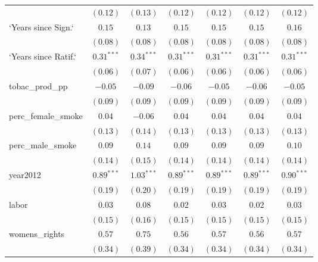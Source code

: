 \begin{table}[!h]
\begin{center}
\begin{tabular}{l c c c c c c }
                        & $(0.12)$     & $(0.13)$      & $(0.12)$     & $(0.12)$     & $(0.12)$     & $(0.12)$     \\
`Years since Sign.`     & $0.15$       & $0.13$        & $0.15$       & $0.15$       & $0.15$       & $0.16$       \\
                        & $(0.08)$     & $(0.08)$      & $(0.08)$     & $(0.08)$     & $(0.08)$     & $(0.08)$     \\
`Years since Ratif.`    & $0.31^{***}$ & $0.34^{***}$  & $0.31^{***}$ & $0.31^{***}$ & $0.31^{***}$ & $0.31^{***}$ \\
                        & $(0.06)$     & $(0.07)$      & $(0.06)$     & $(0.06)$     & $(0.06)$     & $(0.06)$     \\
tobac\_prod\_pp         & $-0.05$      & $-0.09$       & $-0.06$      & $-0.05$      & $-0.06$      & $-0.05$      \\
                        & $(0.09)$     & $(0.09)$      & $(0.09)$     & $(0.09)$     & $(0.09)$     & $(0.09)$     \\
perc\_female\_smoke     & $0.04$       & $-0.06$       & $0.04$       & $0.04$       & $0.04$       & $0.04$       \\
                        & $(0.13)$     & $(0.14)$      & $(0.13)$     & $(0.13)$     & $(0.13)$     & $(0.13)$     \\
perc\_male\_smoke       & $0.09$       & $0.14$        & $0.09$       & $0.09$       & $0.09$       & $0.10$       \\
                        & $(0.14)$     & $(0.15)$      & $(0.14)$     & $(0.14)$     & $(0.14)$     & $(0.14)$     \\
year2012                & $0.89^{***}$ & $1.03^{***}$  & $0.89^{***}$ & $0.89^{***}$ & $0.89^{***}$ & $0.90^{***}$ \\
                        & $(0.19)$     & $(0.20)$      & $(0.19)$     & $(0.19)$     & $(0.19)$     & $(0.19)$     \\
labor                   & $0.03$       & $0.08$        & $0.02$       & $0.03$       & $0.02$       & $0.03$       \\
                        & $(0.15)$     & $(0.16)$      & $(0.15)$     & $(0.15)$     & $(0.15)$     & $(0.15)$     \\
womens\_rights          & $0.57$       & $0.75$        & $0.56$       & $0.57$       & $0.56$       & $0.57$       \\
                        & $(0.34)$     & $(0.39)$      & $(0.34)$     & $(0.34)$     & $(0.34)$     & $(0.34)$     \\

\end{tabular}
\end{center}
\end{table}
